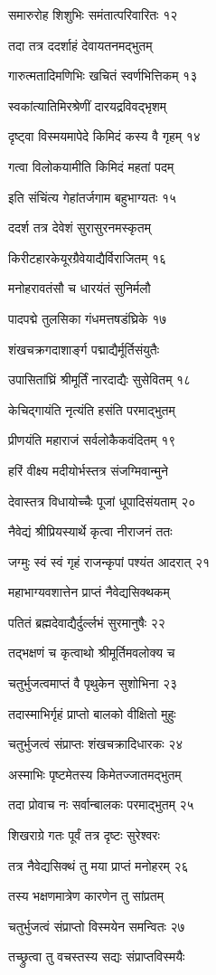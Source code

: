 समारुरोह शिशुभिः समंतात्परिवारितः १२

तदा तत्र ददर्शाहं देवायतनमद्भुतम्

गारुत्मतादिमणिभिः खचितं स्वर्णभित्तिकम् १३

स्वकांत्यातिमिरश्रेणीं दारयद्रविवद्भृशम्

दृष्ट्वा विस्मयमापेदे किमिदं कस्य वै गृहम् १४

गत्वा विलोकयामीति किमिदं महतां पदम्

इति संचिंत्य गेहांतर्जगाम बहुभाग्यतः १५

ददर्श तत्र देवेशं सुरासुरनमस्कृतम्

किरीटहारकेयूरग्रैवेयाद्यैर्विराजितम् १६

मनोहरावतंसौ च धारयंतं सुनिर्मलौ

पादपद्मे तुलसिका गंधमत्तषडंघ्रिके १७

शंखचक्रगदाशार्ङ्ग पद्माद्यैर्मूर्तिसंयुतैः

उपासितांघ्रिं श्रीमूर्तिं नारदाद्यैः सुसेवितम् १८

केचिद्गायंति नृत्यंति हसंति परमाद्भुतम्

प्रीणयंति महाराजं सर्वलोकैकवंदितम् १९

हरिं वीक्ष्य मदीयोर्भस्तत्र संजग्मिवान्मुने

देवास्तत्र विधायोच्चैः पूजां धूपादिसंयताम् २०

नैवेद्यं श्रीप्रियस्यार्थे कृत्वा नीराजनं ततः

जग्मुः स्वं स्वं गृहं राजन्कृपां पश्यंत आदरात् २१

महाभाग्यवशात्तेन प्राप्तं नैवेद्यसिक्थकम्

पतितं ब्रह्मदेवाद्यैर्दुर्ल्लभं सुरमानुषैः २२

तद्भक्षणं च कृत्वाथो श्रीमूर्तिमवलोक्य च

चतुर्भुजत्वमाप्तं वै पृथुकेन सुशोभिना २३

तदास्माभिर्गृहं प्राप्तो बालको वीक्षितो मुहुः

चतुर्भुजत्वं संप्राप्तः शंखचक्रादिधारकः २४

अस्माभिः पृष्टमेतस्य किमेतज्जातमद्भुतम्

तदा प्रोवाच नः सर्वान्बालकः परमाद्भुतम् २५

शिखराग्रे गतः पूर्वं तत्र दृष्टः सुरेश्वरः

तत्र नैवेद्यसिक्थं तु मया प्राप्तं मनोहरम् २६

तस्य भक्षणमात्रेण कारणेन तु सांप्रतम्

चतुर्भुजत्वं संप्राप्तो विस्मयेन समन्वितः २७

तच्छ्रुत्वा तु वचस्तस्य सद्यः संप्राप्तविस्मयैः


